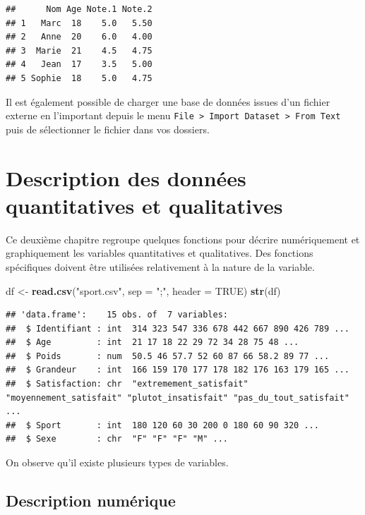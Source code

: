 \documentclass[
]{book}
\newenvironment{Shaded}{\begin{snugshade}}{\end{snugshade}}
\newcommand{\AttributeTok}[1]{\textcolor[rgb]{0.13,0.29,0.53}{#1}}
\newcommand{\ConstantTok}[1]{\textcolor[rgb]{0.56,0.35,0.01}{#1}}
\newcommand{\FunctionTok}[1]{\textcolor[rgb]{0.13,0.29,0.53}{\textbf{#1}}}
\newcommand{\NormalTok}[1]{#1}
\newcommand{\OtherTok}[1]{\textcolor[rgb]{0.56,0.35,0.01}{#1}}
\newcommand{\StringTok}[1]{\textcolor[rgb]{0.31,0.60,0.02}{#1}}
\begin{document}
\begin{verbatim}
##      Nom Age Note.1 Note.2
## 1   Marc  18    5.0   5.50
## 2   Anne  20    6.0   4.00
## 3  Marie  21    4.5   4.75
## 4   Jean  17    3.5   5.00
## 5 Sophie  18    5.0   4.75
\end{verbatim}

Il est également possible de charger une base de données issues d'un fichier externe en l'important depuis le menu \texttt{File\ \textgreater{}\ Import\ Dataset\ \textgreater{}\ From\ Text} puis de sélectionner le fichier dans vos dossiers.

\chapter{Description des données quantitatives et qualitatives}\label{description-des-donnuxe9es-quantitatives-et-qualitatives}

Ce deuxième chapitre regroupe quelques fonctions pour décrire numériquement et graphiquement les variables quantitatives et qualitatives. Des fonctions spécifiques doivent être utilisées relativement à la nature de la variable.

\begin{Shaded}
\begin{Highlighting}[]
\NormalTok{df }\OtherTok{\textless{}{-}} \FunctionTok{read.csv}\NormalTok{(}\StringTok{"sport.csv"}\NormalTok{, }\AttributeTok{sep =} \StringTok{";"}\NormalTok{, }\AttributeTok{header =} \ConstantTok{TRUE}\NormalTok{)}
\FunctionTok{str}\NormalTok{(df)}
\end{Highlighting}
\end{Shaded}

\begin{verbatim}
## 'data.frame':    15 obs. of  7 variables:
##  $ Identifiant : int  314 323 547 336 678 442 667 890 426 789 ...
##  $ Age         : int  21 17 18 22 29 72 34 28 75 48 ...
##  $ Poids       : num  50.5 46 57.7 52 60 87 66 58.2 89 77 ...
##  $ Grandeur    : int  166 159 170 177 178 182 176 163 179 165 ...
##  $ Satisfaction: chr  "extremement_satisfait" "moyennement_satisfait" "plutot_insatisfait" "pas_du_tout_satisfait" ...
##  $ Sport       : int  180 120 60 30 200 0 180 60 90 320 ...
##  $ Sexe        : chr  "F" "F" "F" "M" ...
\end{verbatim}

On observe qu'il existe plusieurs types de variables.

\section{Description numérique}\label{description-numuxe9rique}
\end{document}
